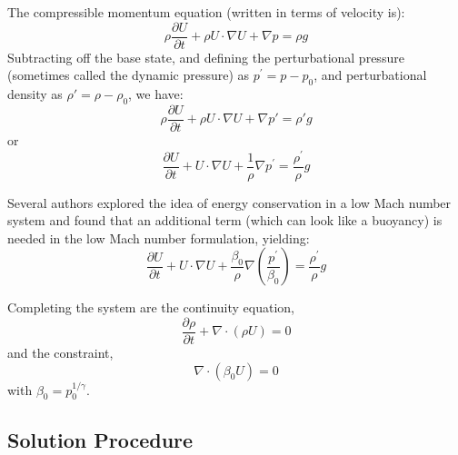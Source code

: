 The compressible momentum equation (written in terms of velocity is):
\begin{equation}
\rho \frac{\partial U}{\partial t} + \rho U \cdot \nabla U + \nabla p = \rho g
\end{equation}
Subtracting off the base state, and defining the perturbational
pressure (sometimes called the dynamic pressure) as $p^\prime = p -
p_0$, and perturbational density as $\rho' = \rho - \rho_0$, we have:
\begin{equation}
\rho \frac{\partial U}{\partial t} + \rho U \cdot \nabla U + \nabla p' = \rho' g
\end{equation}
or 
\begin{equation}
\frac{\partial U}{\partial t} + U \cdot \nabla U + \frac{1}{\rho} \nabla p^\prime = 
   \frac{\rho^\prime}{\rho} g
\end{equation}

Several authors \cite{KP:2012,VLBWZ:2013} explored the idea of energy
conservation in a low Mach number system and found that an additional term (which can
look like a buoyancy) is needed in the low Mach number formulation, yielding:
\begin{equation}
\frac{\partial U}{\partial t} + U \cdot \nabla U + 
   \frac{\beta_0}{\rho} \nabla \left (\frac{p^\prime}{\beta_0} \right ) = 
   \frac{\rho^\prime}{\rho} g
\end{equation}

Completing the system are the continuity equation,
\begin{equation}
\frac{\partial \rho}{\partial t} + \nabla \cdot (\rho U) = 0
\end{equation}
and the constraint,
\begin{equation}
\nabla \cdot (\beta_0 U) = 0
\end{equation}
with $\beta_0 = p_0^{1/\gamma}$.

  
\subsection{Solution Procedure}

\label{sec:lm:density}

